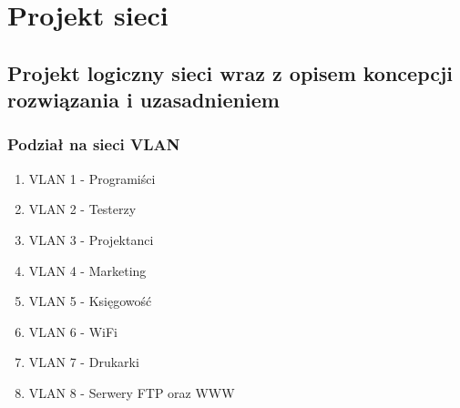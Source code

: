 \documentclass[a4paper,12pt]{extarticle}  %
\begin{document}
\section{Projekt sieci}
\subsection{Projekt logiczny sieci wraz z opisem koncepcji rozwiązania i uzasadnieniem}
\begin{figure}[H]
	\centering
\end{figure}
\cleardoublepage
\subsubsection{Podział na sieci VLAN}
\begin{enumerate}
	\item VLAN 1 - Programiści
	\item VLAN 2 - Testerzy
	\item VLAN 3 - Projektanci
	\item VLAN 4 - Marketing
	\item VLAN 5 - Księgowość
	\item VLAN 6 - WiFi
	\item VLAN 7 - Drukarki
	\item VLAN 8 - Serwery FTP oraz WWW
\end{enumerate}
\end{document}
